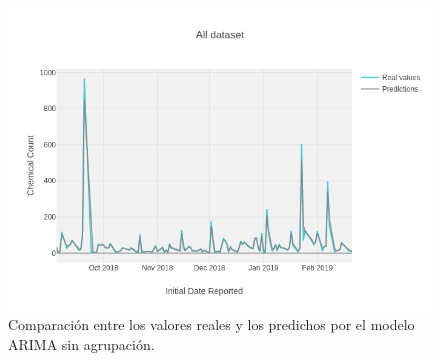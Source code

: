 \begin{figure}[!th]
\includegraphics[scale=0.5]{figures/ts-alldataset}
\centering
\caption{Comparación entre los valores reales y los predichos por el modelo ARIMA sin agrupación.}
\label{fig:ts-alldataset}
\end{figure}
